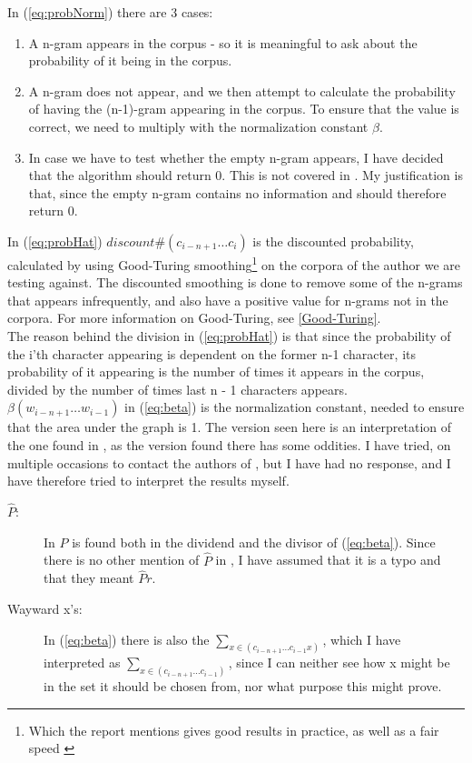 In (\ref{eq:probNorm}) there are 3 cases:
\begin{enumerate}
\item A n-gram appears in the corpus - so it is meaningful to ask about the probability of it being in the corpus.
\item  A n-gram does not appear, and we then attempt to calculate the probability of having the (n-1)-gram appearing in the corpus. To ensure that the value is correct, we need to multiply with the normalization constant $\beta$. 
\item In case we have to test whether the empty n-gram appears, I have decided that the algorithm should return 0. This is not covered in \cite{nr4}. My justification is that, since the empty n-gram contains no information and should therefore return 0.
\end{enumerate}
In (\ref{eq:probHat}) $discount\#(c_{i - n + 1} \ldots c_{i})$ 
is the discounted probability, calculated by using Good-Turing smoothing\footnote{Which the report mentions gives good results in practice, as well as a fair speed \cite{nr4}} on the corpora of the author we are testing against. The discounted smoothing is done to remove some of the n-grams that appears infrequently, and also have a positive value for n-grams not in the corpora. For more information on Good-Turing, see \ref{Good-Turing}.\\

The reason behind the division in (\ref{eq:probHat}) is that since the probability of the i'th character appearing is dependent on the former n-1 character, its probability of it appearing is the number of times it appears in the corpus, divided by the number of times last n - 1 characters appears.\\

$\beta (w_{i - n + 1}\ldots w_{i -1})$ in (\ref{eq:beta}) is the normalization constant, needed to ensure that the area under the graph is 1. The version seen here is an interpretation of the one found in \cite{nr4}, as the version found there has some oddities. I have tried, on multiple occasions to contact the authors of \cite{nr4}, but I have had no response, and I have therefore tried to interpret the results myself.
\begin{description}
\item[$\hat{P}$:]  In \cite{nr4} $\hat{P}$ is found  both in the dividend and the divisor of (\ref{eq:beta}). Since there is no other mention of  $\hat{P}$ in \cite{nr4}, I have assumed that it is a typo and that they meant $\hat{P}r$.
\item[Wayward x's:] In (\ref{eq:beta}) there is also the $\sum_{x \in (c_{i - n + 1} \ldots c_{i-1} x)}$, which I have interpreted as $\sum_{x \in (c_{i - n + 1} \ldots c_{i-1})}$, since I can neither see how x might be in the set it should be chosen from, nor what purpose this might prove.  
\end{description}

